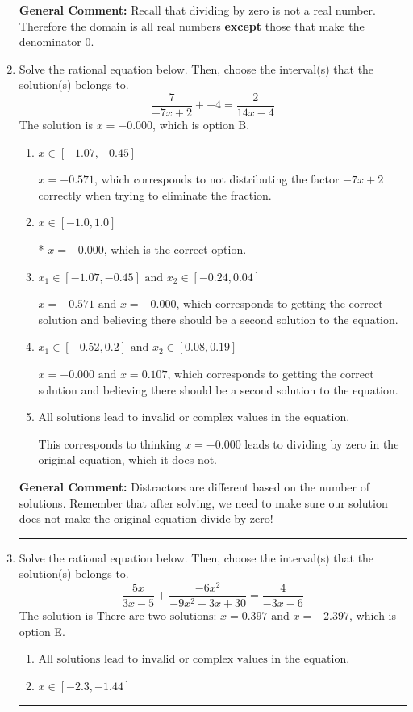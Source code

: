 \documentclass{extbook}[14pt]
\newcommand{\litem}[1]{\item #1

\rule{\textwidth}{0.4pt}}
\begin{document}
\begin{enumerate}
{\textbf{General Comment:} Recall that dividing by zero is not a real number. Therefore the domain is all real numbers \textbf{except} those that make the denominator 0.
}
\litem{
Solve the rational equation below. Then, choose the interval(s) that the solution(s) belongs to.
\[ \frac{7}{-7x + 2} + -4 = \frac{2}{14x -4} \]The solution is \( x = -0.000 \), which is option B.\begin{enumerate}[label=\Alph*.]
\item \( x \in [-1.07,-0.45] \)

$x = -0.571$, which corresponds to not distributing the factor $-7x + 2$ correctly when trying to eliminate the fraction.
\item \( x \in [-1.0,1.0] \)

* $x = -0.000$, which is the correct option.
\item \( x_1 \in [-1.07, -0.45] \text{ and } x_2 \in [-0.24,0.04] \)

$x = -0.571 \text{ and } x = -0.000$, which corresponds to getting the correct solution and believing there should be a second solution to the equation.
\item \( x_1 \in [-0.52, 0.2] \text{ and } x_2 \in [0.08,0.19] \)

$x = -0.000 \text{ and } x = 0.107$, which corresponds to getting the correct solution and believing there should be a second solution to the equation.
\item \( \text{All solutions lead to invalid or complex values in the equation.} \)

This corresponds to thinking $x = -0.000$ leads to dividing by zero in the original equation, which it does not.
\end{enumerate}

\textbf{General Comment:} Distractors are different based on the number of solutions. Remember that after solving, we need to make sure our solution does not make the original equation divide by zero!
}
\litem{
Solve the rational equation below. Then, choose the interval(s) that the solution(s) belongs to.
\[ \frac{5x}{3x -5} + \frac{-6x^{2}}{-9x^{2} -3 x + 30} = \frac{4}{-3x -6} \]The solution is \( \text{There are two solutions: } x = 0.397 \text{ and } x = -2.397 \), which is option E.\begin{enumerate}[label=\Alph*.]
\item \( \text{All solutions lead to invalid or complex values in the equation.} \)


\item \( x \in [-2.3,-1.44] \)



\end{enumerate}}
\end{enumerate}
\end{document}
